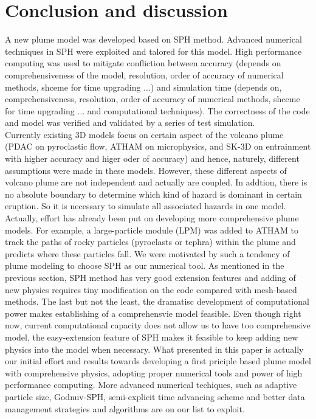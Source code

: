 \documentclass[10pt,a4paper]{article}
\begin{document}
\section{Conclusion and discussion} \label{sec:conclusion}
A new plume model was developed based on SPH method. Advanced numerical  techniques in SPH were exploited and talored for this model. High performance computing was used to mitigate confliction between accuracy (depends on comprehensiveness of the model, resolution, order of accuracy of numerical methods, shceme for time upgrading ...) and simulation time (depends on, comprehensiveness, resolution, order of accuracy of numerical methods, shceme for time upgrading ... and computational techniques). The correctness of the code and model was verified and validated by a series of test simulation.\\
Currently existing 3D models focus on certain aspect of the volcano plume (PDAC on pyroclastic flow, ATHAM on microphysics, and SK-3D on entrainment with higher accuracy and higer oder of accuracy) and hence, naturely, different assumptions were made in these models. However, these different aspects of volcano plume are not independent and actually are coupled. In addtion, there is no absolute boundary to determine which kind of hazard is dominant in certain eruption. So it is necessary to simulate all associated hazards in one model. Actually, effort has already been put on developing more comprehensive plume models. For example, a large-particle module (LPM) was added to ATHAM to track the paths of rocky particles (pyroclasts or tephra) within the plume and predicts where these particles fall\citep{kobs2009modeling}. We were motivated by such a tendency of plume modeling to choose SPH as our numerical tool. As mentioned in the previous section, SPH method has very good extension features and adding of new physics requires tiny modification on the code compared with mesh-based methods. The last but not the least, the dramatisc development of computational power makes establishing of a comprehensvie model feasible. Even though right now, current computational capacity does not allow us to have too comprehensive model, the easy-extension feature of SPH makes it feasible to keep adding new physics into the model when necessary. What presented in this paper is actually our initial effort and results towards developing a first priciple based plume model with comprehensive physics, adopting proper numerical tools and power of high performance computing. More advanced numerical techiques, such as adaptive particle size, Godnuv-SPH, semi-explicit time advancing scheme and better data management strategies and algorithms are on our list to exploit.


\end{document}
